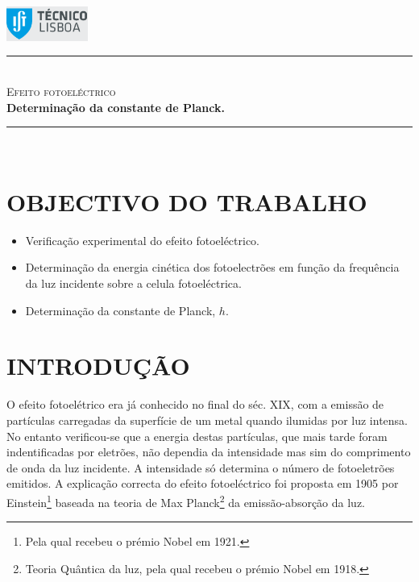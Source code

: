 \documentclass[a4paper,12pt]{article}  %
\author{Prof. Bernardo B. Carvalho}
\date{ Outubro 2014}
\newcommand{\HRule}{\rule{\linewidth}{0.5mm}}
\begin{document}
 

	\includegraphics[width=0.2\textwidth]{../logo-ist}%

	\HRule \\[0.5cm]
	{ \huge \sf  \textsc{Efeito fotoeléctrico}} \\[0.4cm] %
	{ \large \bfseries Determinação da constante de Planck.}\\
	\HRule \\%

\section{\sf OBJECTIVO DO TRABALHO}
\begin{itemize}
\item Verificação experimental do efeito fotoeléctrico.
\item Determinação da energia cinética dos fotoelectrões em função da frequência da luz incidente sobre a celula fotoeléctrica.
\item  Determinação da constante de Planck, $h$.
\end{itemize}


\section{\sf INTRODUÇÃO }
O efeito fotoelétrico era já conhecido no final do séc. XIX, com a emissão  de partículas carregadas da superfície de um metal quando ilumidas por luz intensa. No entanto  verificou-se que a energia destas partículas, que mais tarde foram indentificadas por eletrões, não dependia da intensidade mas sim do comprimento de onda da  luz incidente. A intensidade só determina o número de fotoeletrões emitidos. A explicação correcta do efeito fotoeléctrico foi proposta em 1905 por Einstein\footnote{Pela qual recebeu o prémio Nobel em 1921.} baseada na teoria de Max Planck\footnote{Teoria Quântica da luz, pela qual recebeu o prémio Nobel em 1918.} da emissão-absorção da luz. 
\end{document}
